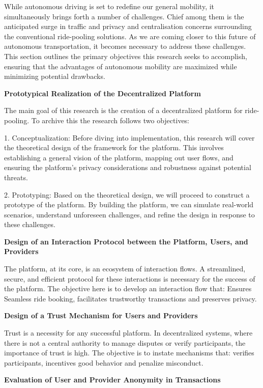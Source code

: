 While autonomous driving is set to redefine our general mobility, it simultaneously brings forth a number of challenges. Chief among them is the anticipated surge in traffic and privacy and centralisation concerns surrounding the conventional ride-pooling solutions. As we are coming closer to this future of autonomous transportation, it becomes necessary to address these challenges. This section outlines the primary objectives this research seeks to accomplish, ensuring that the advantages of autonomous mobility are maximized while minimizing potential drawbacks.


\textbf{Prototypical Realization of the Decentralized Platform}

The main goal of this research is the creation of a decentralized platform for ride-pooling.  To archive this  the research follows two objectives:

1. Conceptualization: Before diving into implementation, this research will cover the theoretical design of the framework for the platform. This involves establishing a general vision of the platform, mapping out user flows, and ensuring the platform's privacy considerations and robustness against potential threats.

2. Prototyping: Based on the theoretical design, we will proceed to construct a prototype of the platform. By building the platform,  we can simulate real-world scenarios, understand unforeseen challenges, and refine the design in response to these challenges.


\textbf{Design of an Interaction Protocol between the Platform, Users, and Providers}

The platform, at its core, is an ecosystem of interaction flows.  A streamlined, secure, and efficient protocol for these interactions is necessary for the success of the platform. The objective here is to develop an interaction flow that: Ensures Seamless ride booking, facilitates trustworthy transactions and preserves privacy.


\textbf{Design of a Trust Mechanism for Users and Providers}

Trust is a necessity for any successful platform. In decentralized systems, where there is not a central authority to manage disputes or verify participants, the importance of trust is high. The objective is to instate mechanisms that: verifies participants, incentives good behavior and penalize misconduct.


\textbf{Evaluation of User and Provider Anonymity in Transactions}

